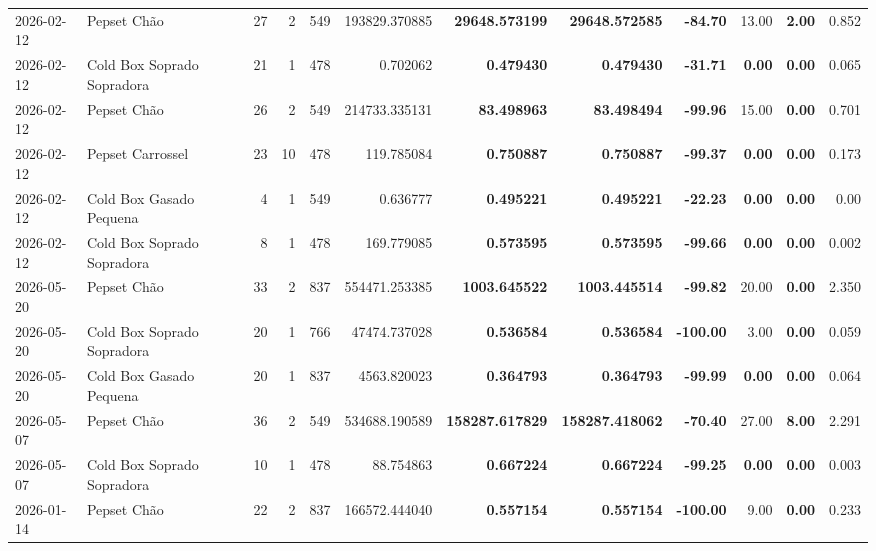 {\begin{center}
{\begin{tabular}{@{}llrrrrrrrrrr@{}}
2026-02-12 & Pepset Chão & 27 & 2 & 549 & 193829.370885 & \textbf{29648.573199} & \textbf{29648.572585} & \textbf{-84.70} & 13.00 & \textbf{2.00} & 0.852 \\
2026-02-12 & Cold Box Soprado Sopradora & 21 & 1 & 478 & 0.702062 & \textbf{0.479430} & \textbf{0.479430} & \textbf{-31.71} & \textbf{0.00} & \textbf{0.00} & 0.065 \\
2026-02-12 & Pepset Chão & 26 & 2 & 549 & 214733.335131 & \textbf{83.498963} & \textbf{83.498494} & \textbf{-99.96} & 15.00 & \textbf{0.00} & 0.701 \\
2026-02-12 & Pepset Carrossel & 23 & 10 & 478 & 119.785084 & \textbf{0.750887} & \textbf{0.750887} & \textbf{-99.37} & \textbf{0.00} & \textbf{0.00} & 0.173 \\
2026-02-12 & Cold Box Gasado Pequena & 4 & 1 & 549 & 0.636777 & \textbf{0.495221} & \textbf{0.495221} & \textbf{-22.23} & \textbf{0.00} & \textbf{0.00} & 0.00 \\
2026-02-12 & Cold Box Soprado Sopradora & 8 & 1 & 478 & 169.779085 & \textbf{0.573595} & \textbf{0.573595} & \textbf{-99.66} & \textbf{0.00} & \textbf{0.00} & 0.002 \\
2026-05-20 & Pepset Chão & 33 & 2 & 837 & 554471.253385 & \textbf{1003.645522} & \textbf{1003.445514} & \textbf{-99.82} & 20.00 & \textbf{0.00} & 2.350 \\
2026-05-20 & Cold Box Soprado Sopradora & 20 & 1 & 766 & 47474.737028 & \textbf{0.536584} & \textbf{0.536584} & \textbf{-100.00} & 3.00 & \textbf{0.00} & 0.059 \\
2026-05-20 & Cold Box Gasado Pequena & 20 & 1 & 837 & 4563.820023 & \textbf{0.364793} & \textbf{0.364793} & \textbf{-99.99} & \textbf{0.00} & \textbf{0.00} & 0.064 \\
2026-05-07 & Pepset Chão & 36 & 2 & 549 & 534688.190589 & \textbf{158287.617829} & \textbf{158287.418062} & \textbf{-70.40} & 27.00 & \textbf{8.00} & 2.291 \\
2026-05-07 & Cold Box Soprado Sopradora & 10 & 1 & 478 & 88.754863 & \textbf{0.667224} & \textbf{0.667224} & \textbf{-99.25} & \textbf{0.00} & \textbf{0.00} & 0.003 \\
2026-01-14 & Pepset Chão & 22 & 2 & 837 & 166572.444040 & \textbf{0.557154} & \textbf{0.557154} & \textbf{-100.00} & 9.00 & \textbf{0.00} & 0.233 \\
\bottomrule
\end{tabular}%
}
\end{center}
}
\vspace*{\fill}
\newpage
\vspace*{\fill}
